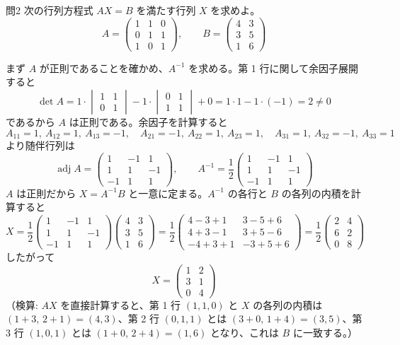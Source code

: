 \documentclass[a4paper,11pt]{article}
\begin{document}
\clearpage
\begin{mondaiboxS}{問2}
次の行列方程式 $AX = B$ を満たす行列 $X$ を求めよ。
\[
A =
\begin{pmatrix}
1 & 1 & 0 \\
0 & 1 & 1 \\
1 & 0 & 1
\end{pmatrix},
\qquad
B =
\begin{pmatrix}
4 & 3 \\
3 & 5 \\
1 & 6
\end{pmatrix}
\]
\end{mondaiboxS}
\kaitou
まず $A$ が正則であることを確かめ、$A^{-1}$ を求める。第 1 行に関して余因子展開すると
\[
\det A = 1\cdot\begin{vmatrix}1&1\\0&1\end{vmatrix} - 1\cdot\begin{vmatrix}0&1\\1&1\end{vmatrix} + 0
= 1\cdot 1 - 1\cdot(-1) = 2 \neq 0
\]
であるから $A$ は正則である。余因子を計算すると
\[
A_{11}=1,\ A_{12}=1,\ A_{13}=-1,\quad
A_{21}=-1,\ A_{22}=1,\ A_{23}=1,\quad
A_{31}=1,\ A_{32}=-1,\ A_{33}=1
\]
より随伴行列は
\[
\operatorname{adj}A =
\begin{pmatrix}
1 & -1 & 1 \\
1 & 1 & -1 \\
-1 & 1 & 1
\end{pmatrix},
\qquad
A^{-1} = \frac{1}{2}
\begin{pmatrix}
1 & -1 & 1 \\
1 & 1 & -1 \\
-1 & 1 & 1
\end{pmatrix}
\]
$A$ は正則だから $X = A^{-1}B$ と一意に定まる。$A^{-1}$ の各行と $B$ の各列の内積を計算すると
\[
X = \frac{1}{2}
\begin{pmatrix}
1 & -1 & 1 \\
1 & 1 & -1 \\
-1 & 1 & 1
\end{pmatrix}
\begin{pmatrix}
4 & 3 \\
3 & 5 \\
1 & 6
\end{pmatrix}
= \frac{1}{2}
\begin{pmatrix}
4-3+1 & 3-5+6 \\
4+3-1 & 3+5-6 \\
-4+3+1 & -3+5+6
\end{pmatrix}
= \frac{1}{2}
\begin{pmatrix}
2 & 4 \\
6 & 2 \\
0 & 8
\end{pmatrix}
\]
したがって
\[
\boxed{\; X =
\begin{pmatrix}
1 & 2 \\
3 & 1 \\
0 & 4
\end{pmatrix} \;}
\]
（検算: $AX$ を直接計算すると、第 1 行 $(1,1,0)$ と $X$ の各列の内積は $(1+3,\,2+1)=(4,3)$、第 2 行 $(0,1,1)$ とは $(3+0,\,1+4)=(3,5)$、第 3 行 $(1,0,1)$ とは $(1+0,\,2+4)=(1,6)$ となり、これは $B$ に一致する。）
\end{document}
